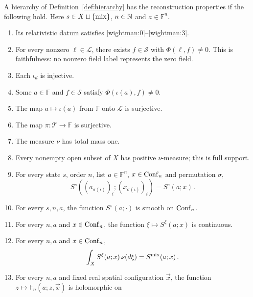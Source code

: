 \begin{definition}\label{def:reconstructed}
A hierarchy of Definition~\ref{def:hierarchy} has the reconstruction properties if the following hold.
Here $s\in X\sqcup\{\mathrm{mix}\}$, $n\in\mathbb N$ and $a\in\mathbb F^n$.
\begin{enumerate}[label=\textup{R\arabic*.},ref=R\arabic*]
\item\label{recon:1} Its relativistic datum satisfies \ref{wightman:0}--\ref{wightman:3}.
\item\label{recon:2} For every nonzero $\ell\in\mathcal L$, there exists $f\in\mathcal S$ with $\Phi(\ell,f)\ne0$.
This is faithfulness: no nonzero field label represents the zero field.
\item\label{recon:3} Each $\iota_d$ is injective.
\item\label{recon:4} Some $a\in\mathbb F$ and $f\in\mathcal S$ satisfy $\Phi(\iota(a),f)\ne0$.
\item\label{recon:5} The map $a\mapsto\iota(a)$ from $\mathbb F$ onto $\mathcal L$ is surjective.
\item\label{recon:6} The map $\pi:\mathcal T\to\mathbb F$ is surjective.
\item\label{recon:7} The measure $\nu$ has total mass one.
\item\label{recon:8} Every nonempty open subset of $X$ has positive $\nu$-measure; this is full support.
\item\label{recon:9} For every state $s$, order $n$, list $a\in\mathbb F^n$, $x\in\operatorname{Conf}_{n}$ and permutation $\sigma$,
\begin{equation}\label{eq:permutation}
S^s((a_{\sigma(i)})_i;(x_{\sigma(i)})_i)=S^s(a;x)\,.
\end{equation}
\item\label{recon:10} For every $s,n,a$, the function $S^s(a;\cdot)$ is smooth on $\operatorname{Conf}_{n}$.
\item\label{recon:11} For every $n,a$ and $x\in\operatorname{Conf}_{n}$, the function $\xi\mapsto S^\xi(a;x)$ is continuous.
\item\label{recon:12} For every $n,a$ and $x\in\operatorname{Conf}_{n}$,
\begin{equation}\label{eq:mixture}
\int_X S^\xi(a;x)\,\nu(d\xi)=S^{\mathrm{mix}}(a;x)\,.
\end{equation}
\item\label{recon:13} For every $n,a$ and fixed real spatial configuration $\vec x$, the function $z\mapsto\mathsf F_n(a;z,\vec x)$ is holomorphic on
\begin{equation}\label{eq:tube}

\end{equation}
\end{enumerate}
\end{definition}
